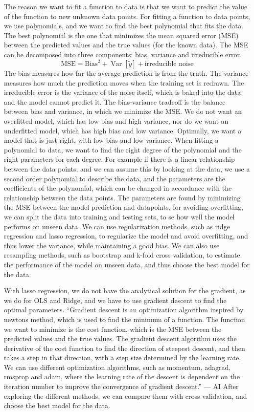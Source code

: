 \documentclass[aps,rmp,reprint,amsmath,amssymb,longbibliography]{revtex4-1}
\begin{document}
The reason we want to fit a function to data is that we want to
predict the value of the function to new unknown data points. For fitting a function to
data points, we use polynomials, and we want to find the best polynomial that fits the data.
The best polynomial is the one that minimizes the mean squared error (MSE) between the predicted values and the true values (for the known data).
The MSE can be decomposed into three components: bias, variance and irreducible error.
\[
  \mathrm{MSE} = \mathrm{Bias}^2 + \operatorname{Var}[\tilde{y}]
  + \text{irreducible noise}
\]
The bias measures how far the average prediction is from the truth.
The variance measures how much the prediction moves when the training
set is redrawn.
The irreducible error is the variance of the noise itself,
which is baked into the data and the model cannot predict it. \cite[p.~62]{LectureNotes}
The bias-variance tradeoff is the balance between bias and variance, in which we minimize the MSE. We do not want
an overfitted model, which has low bias and high variance, nor do we want an underfitted model, which has high bias and low variance.
Optimally, we want a model that is just right, with low bias and low variance.
When fitting a polynomial to data, we want to find the right degree of the polynomial and
the right parameters for each degree. For example if there is a linear relationship between
the data points, and we can assume this by looking at the data, we use a second order polynomial
to describe the data, and the parameters are the coefficients of the polynomial, which can be
changed in accordance with the relationship between the data points.
The parameters are found by minimizing the MSE between the model prediction and datapoints,
for avoiding overfitting, we can split the data into training and testing sets, to se how well
the model performs on unseen data. We can use regularization methods, such as ridge regression
and lasso regression, to regularize the model and avoid overfitting, and thus lower the variance, while maintaining a good bias.
We can also use resampling methods, such as bootstrap and k-fold cross validation, to estimate the performance of the model on unseen data,
and thus choose the best model for the data.

With lasso regression, we do not have the analytical solution for the gradient, as we do for OLS and Ridge, and we have to use gradient descent to find the optimal parameters.
``Gradient descent is an optimization algorithm inspired by newtons method, which is used to find the minimum of a function.
The function we want to minimize is the cost function, which is the MSE between the predicted values and the true values.
The gradient descent algorithm uses the derivative of the cost function to find the direction of steepest descent,
 and then takes a step in that direction, with a step size determined by the learning rate.
 We can use different optimization algorithms, such as momentum, adagrad, rmsprop and adam,
where the learning rate of the descent is dependent on the iteration number to improve the convergence of gradient descent.'' --- AI
After exploring the different methods, we can compare them with cross validation, and choose the best model for the data.
\end{document}
